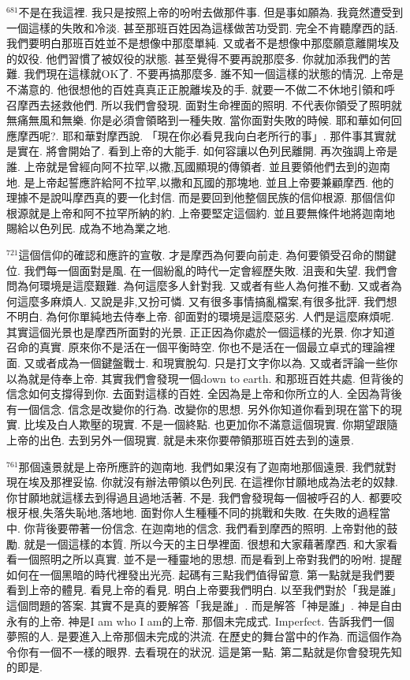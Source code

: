 \documentclass{book}
\begin{document}
$^{681}$不是在我這裡.
我只是按照上帝的吩咐去做那件事.
但是事如願為.
我竟然遭受到一個這樣的失敗和冷淡.
甚至那班百姓因為這樣做苦功受罰.
完全不肯聽摩西的話.
我們要明白那班百姓並不是想像中那麼單純.
又或者不是想像中那麼願意離開埃及的奴役.
他們習慣了被奴役的狀態.
甚至覺得不要再說那麼多.
你就加添我們的苦難.
我們現在這樣就OK了.
不要再搞那麼多.
誰不知一個這樣的狀態的情況.
上帝是不滿意的.
他很想他的百姓真真正正脫離埃及的手.
就要一不做二不休地引領和呼召摩西去拯救他們.
所以我們會發現.
面對生命裡面的照明.
不代表你領受了照明就無痛無風和無樂.
你是必須會領略到一種失敗.
當你面對失敗的時候.
耶和華如何回應摩西呢?.
耶和華對摩西說.
「現在你必看見我向白老所行的事」.
那件事其實就是實在.
將會開始了.
看到上帝的大能手.
如何容讓以色列民離開.
再次強調上帝是誰.
上帝就是曾經向阿不拉罕,以撒,瓦國顯現的傳領者.
並且要領他們去到的迦南地.
是上帝起誓應許給阿不拉罕,以撒和瓦國的那塊地.
並且上帝要兼顧摩西.
他的理據不是說叫摩西真的要一化封信.
而是要回到他整個民族的信仰根源.
那個信仰根源就是上帝和阿不拉罕所納的約.
上帝要堅定這個約.
並且要無條件地將迦南地賜給以色列民.
成為不地為業之地.

$^{721}$這個信仰的確認和應許的宣敬.
才是摩西為何要向前走.
為何要領受召命的關鍵位.
我們每一個面對是風.
在一個紛亂的時代一定會經歷失敗.
沮喪和失望.
我們會問為何環境是這麼艱難.
為何這麼多人針對我.
又或者有些人為何推不動.
又或者為何這麼多麻煩人.
又說是非,又扮可憐.
又有很多事情搞亂檔案,有很多批評.
我們想不明白.
為何你單純地去侍奉上帝.
卻面對的環境是這麼惡劣.
人們是這麼麻煩呢.
其實這個光景也是摩西所面對的光景.
正正因為你處於一個這樣的光景.
你才知道召命的真實.
原來你不是活在一個平衡時空.
你也不是活在一個最立卓式的理論裡面.
又或者成為一個鍵盤戰士.
和現實脫勾.
只是打文字你以為.
又或者評論一些你以為就是侍奉上帝.
其實我們會發現一個down to earth.
和那班百姓共處.
但背後的信念如何支撐得到你.
去面對這樣的百姓.
全因為是上帝和你所立的人.
全因為背後有一個信念.
信念是改變你的行為.
改變你的思想.
另外你知道你看到現在當下的現實.
比埃及白人欺壓的現實.
不是一個終點.
也更加你不滿意這個現實.
你期望跟隨上帝的出色.
去到另外一個現實.
就是未來你要帶領那班百姓去到的遠景.

$^{761}$那個遠景就是上帝所應許的迦南地.
我們如果沒有了迦南地那個遠景.
我們就對現在埃及那裡妥協.
你就沒有辦法帶領以色列民.
在這裡你甘願地成為法老的奴隸.
你甘願地就這樣去到得過且過地活著.
不是.
我們會發現每一個被呼召的人.
都要咬根牙根,失落失恥地,落地地.
面對你人生種種不同的挑戰和失敗.
在失敗的過程當中.
你背後要帶著一份信念.
在迦南地的信念.
我們看到摩西的照明.
上帝對他的鼓勵.
就是一個這樣的本質.
所以今天的主日學裡面.
很想和大家藉著摩西.
和大家看看一個照明之所以真實.
並不是一種靈地的思想.
而是看到上帝對我們的吩咐.
提醒如何在一個黑暗的時代裡發出光亮.
起碼有三點我們值得留意.
第一點就是我們要看到上帝的體見.
看見上帝的看見.
明白上帝要我們明白.
以至我們對於「我是誰」這個問題的答案.
其實不是真的要解答「我是誰」.
而是解答「神是誰」.
神是自由永有的上帝.
神是I am who I am的上帝.
那個未完成式.
Imperfect.
告訴我們一個夢照的人.
是要進入上帝那個未完成的洪流.
在歷史的舞台當中的作為.
而這個作為令你有一個不一樣的眼界.
去看現在的狀況.
這是第一點.
第二點就是你會發現先知的即是.
\end{document}
